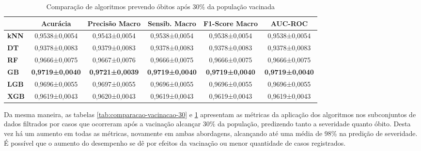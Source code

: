 \begin{table}[H]
  \footnotesize
  \centering
  \begin{tabular}{l|c|c|c|c|c|}
    \cline{2-6}
    \multicolumn{1}{c|}{\textbf{}}     & \textbf{Acurácia}      & \textbf{Precisão Macro} & \textbf{Sensib. Macro} & \textbf{F1-Score Macro} & \textbf{AUC-ROC}       \\ \hline
    \multicolumn{1}{|l|}{\textbf{kNN}} & 0,9538±0,0054          & 0,9543±0,0054           & 0,9538±0,0054          & 0,9538±0,0054           & 0,9538±0,0054          \\ \hline
    \multicolumn{1}{|l|}{\textbf{DT}}  & 0,9378±0,0083          & 0,9379±0,0083           & 0,9378±0,0083          & 0,9378±0,0083           & 0,9378±0,0083          \\ \hline
    \multicolumn{1}{|l|}{\textbf{RF}}  & 0,9666±0,0075          & 0,9667±0,0076           & 0,9666±0,0075          & 0,9666±0,0075           & 0,9666±0,0075          \\ \hline
    \multicolumn{1}{|l|}{\textbf{GB}}  & \textbf{0,9719±0,0040} & \textbf{0,9721±0,0039}  & \textbf{0,9719±0,0040} & \textbf{0,9719±0,0040}  & \textbf{0,9719±0,0040} \\ \hline
    \multicolumn{1}{|l|}{\textbf{LGB}} & 0,9696±0,0055          & 0,9697±0,0055           & 0,9696±0,0055          & 0,9696±0,0055           & 0,9696±0,0055          \\ \hline
    \multicolumn{1}{|l|}{\textbf{XGB}} & 0,9619±0,0043          & 0,9620±0,0043           & 0,9619±0,0043          & 0,9619±0,0043           & 0,9619±0,0043          \\ \hline
    \end{tabular}
\caption{Comparação de algoritmos prevendo óbitos após 30\% da população vacinada}
\label{tab:comparacao-vacinacao-obito-30}
\end{table}

Da mesma maneira, as tabelas \ref{tab:comparacao-vacinacao-30} e \ref{tab:comparacao-vacinacao-obito-30} apresentam as métricas da aplicação dos algoritmos nos subconjuntos de dados filtrados por casos que ocorreram após a vacinação alcançar 30\% da população, predizendo tanto a severidade quanto óbito. Desta vez há um aumento em todas as métricas, novamente em ambas abordagens, alcançando até uma média de 98\% na predição de severidade. É possível que o aumento do desempenho se dê por efeitos da vacinação ou menor quantidade de casos registrados.
